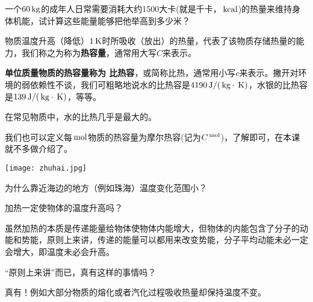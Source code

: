 \documentclass[CJK]{beamer}
\begin{document}
\begin{frame}
\bch
一个$60\,\mathrm{kg}$的成年人日常需要消耗大约1500大卡(就是千卡，$\,\mathrm{kcal}$)的热量来维持身体机能，试计算这些能量能够把他举高到多少米？
\ech
\end{frame}



\begin{frame}
\bch
\bitem
\item{物质温度升高（降低）$1\,\mathrm{K}$时所吸收（放出）的热量，代表了该物质存储热量的能力，我们称之为称为{\bf 热容量}，通常用大写$C$来表示。}
\item{{\bf 单位质量物质的热容量称为 比热容}，或简称比热，通常用小写$c$来表示。撇开对环境的弱依赖性不谈，我们可粗略地说水的比热容是$4190\,\mathrm{J}/(\,\mathrm{kg}\cdot\,\mathrm{K})$，水银的比热容是$139\,\mathrm{J}/(\,\mathrm{kg}\cdot\,\mathrm{K})$，等等。}
\item{在常见物质中，水的比热几乎是最大的。}
\item{我们也可以定义每$\,\mathrm{mol}$物质的热容量为摩尔热容(记为$C^{\,\mathrm{mol}}$)，了解即可，在本课就不多做介绍了。}
\eitem
\ech
\end{frame}


\begin{frame}
\bch
\bcenter
\texttt{[image: zhuhai.jpg]}
\ecenter

为什么靠近海边的地方（例如珠海）温度变化范围小？
\ech
\end{frame}


\begin{frame}
\bch
加热一定使物体的温度升高吗？
\ech
\end{frame}


\begin{frame}
\bch
\bitem
\item{虽然加热的本质是传递能量给物体使物体内能增大，但物体的内能包含了分子的动能和势能，原则上来讲，传递的能量可以都用来改变势能，分子平均动能未必一定会增大，即温度未必会升高。}
\eitem

\skipline

“原则上来讲”而已，真有这样的事情吗？

\skipline

真有！例如大部分物质的熔化或者汽化过程吸收热量却保持温度不变。

\ech
\end{frame}
\end{document}
